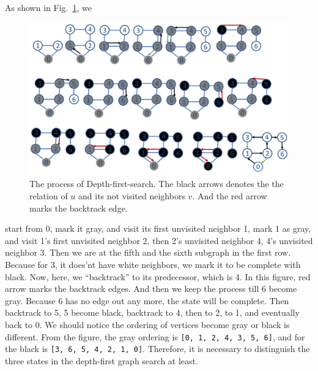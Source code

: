 \documentclass[main.tex]{subfiles}
\begin{document}
As shown in Fig.~\ref{fig:dfs_search_1}, we
 \begin{figure}[!ht]
    \centering
    \includegraphics[width=0.9\columnwidth]{fig/dfs_procedure.png}
    \caption{The process of Depth-first-search. The black arrows denotes the the relation of $u$ and its not visited neighbors $v$. And the red arrow marks the backtrack edge. }
    \label{fig:dfs_search_1}
\end{figure}
start from 0, mark it gray, and visit its first unvisited neighbor 1, mark 1 as gray, and visit 1's first unvisited neighbor 2, then 2's unvisited neighbor 4, 4's unvisited neighbor 3. Then we are at the fifth and the sixth subgraph in the first row. Because for 3, it does'nt have white neighbors, we mark it to be complete with black. Now, here, we ``backtrack'' to its predecessor, which is 4. In this figure, red arrow marks the backtrack edges. And then we keep the process till 6 become gray. Because 6 has no edge out any more, the state will be complete. Then backtrack to 5, 5 become black, backtrack to 4, then to 2, to 1, and eventually back to 0. We should notice the ordering of vertices become gray or black is different. From the figure, the gray ordering is \texttt{[0, 1, 2, 4, 3, 5, 6]}, and for the black is \texttt{[3, 6, 5, 4, 2, 1, 0]}. Therefore, it is necessary to distinguish the three states in the depth-first graph search at least. 
\end{document}
